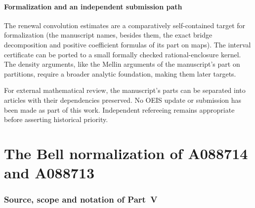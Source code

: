 \documentclass[11pt]{article}
\numberwithin{equation}{section}
\theoremstyle{definition}
\theoremstyle{remark}
\begin{document}
\subsection{Formalization and an independent submission path}

The renewal convolution estimates are a comparatively self-contained
target for formalization (the manuscript names, besides them, the exact
bridge decomposition and positive coefficient formulas of its part on
maps). The interval certificate can be ported to a small formally checked
rational-enclosure kernel. The density arguments, like the Mellin
arguments of the manuscript's part on partitions, require a broader
analytic foundation, making them later targets.

For external mathematical review, the manuscript's parts can be separated
into articles with their dependencies preserved. No OEIS update or
submission has been made as part of this work. Independent refereeing
remains appropriate before asserting historical priority.

\clearpage
\part{The Bell normalization of A088714 and A088713}\label{bnc:part}

\section{Source, scope and notation of Part~V}\label{bnc:sec:source}
\end{document}
